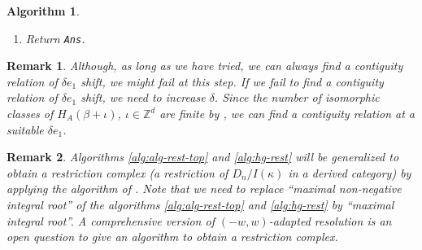 \documentclass{article}
\def\NN{\mathbb{N}}
\def\RR{\mathbb{R}}
\def\ZZ{\mathbb{Z}}
\newtheorem{algorithm}{Algorithm}
\newtheorem{remark}{Remark}
\begin{document}
\begin{algorithm}
\begin{enumerate}
\begin{enumerate}
\begin{enumerate}
\begin{equation}
 \left( \RR^m \setminus V(b) \right) \cap
 \left( \RR \times ({\bar q}_2, \ldots, {\bar q}_m) \right)
\end{equation}
where ${\bar q}_2, \ldots, {\bar q}_m$ are generic numbers.
Let $Q$ be the set of the $q_1 \in \NN_0$ that is the minimum 
in each first coordinate of connected components
of (\ref{eq:segments}).
\item Factorize $b(q)$ into degree $1$ polynomials as $\prod_{j=1}^J b_j(q)$.
\item For all ${\bar q}_1 \in Q$ do
\begin{enumerate}
\item Append $[E \cap K \cap \{ b(q)\not=0 \}, \mbox{\tt Rest}(G,{\bar q}_1),\mbox{the contiguity relation}]$.
\end{enumerate} 
\item For all factors $b_j$ in $b$ do
\begin{enumerate}
\item Eliminate one variable in $q_1, \ldots, q_m$ by $b_i(q)=0$.
Changing indices, we suppose that $q_m$ is eliminated.
\item Express $\beta$ in terms of $q_1, \ldots, q_{m-1}$.
\item Append \, $\mbox{\tt Rfr}(H_A(\beta(q_1, \ldots, q_{m-1}),
(q_1, \ldots, q_{m-1}), G, E \cap K \cap \{b_i=0\})$
to {\tt Ans}.
\end{enumerate}
\end{enumerate}
\end{enumerate}
\item Return {\tt Ans}.
\end{enumerate}
\end{algorithm}

\begin{remark}\rm
Although, as long as we have tried, we can always find a contiguity
relation of $\delta e_1$ shift,
we might fail at this step.
If we fail to find a contiguity relation of $\delta e_1$ shift,
we need to increase $\delta$.
Since the number of isomorphic classes of $H_A(\beta+\iota)$, $\iota \in \ZZ^d$
are finite by \cite{saito-isom}, we can find a contiguity relation
at a suitable $\delta e_1$.
\end{remark}

\begin{remark}\rm
Algorithms \ref{alg:alg-rest-top} and \ref{alg:hg-rest} 
will be generalized to obtain
a restriction complex (a restriction of $D_n/I(\kappa)$ in a derived category)
by applying the algorithm of \cite{OT-rest}.
Note that we need to replace ``maximal non-negative integral root''
of the algorithms \ref{alg:alg-rest-top} and \ref{alg:hg-rest}
by ``maximal integral root''.
A comprehensive version of $(-w,w)$-adapted resolution is an open question
to give an algorithm to obtain a restriction complex.
\end{remark}
\end{document}
